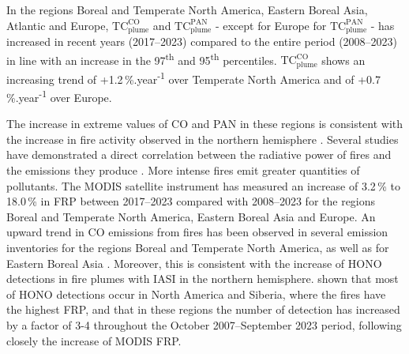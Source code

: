 \documentclass[acp, manuscript]{copernicus}
\begin{document}
In the regions Boreal and Temperate North America, Eastern Boreal Asia, Atlantic and Europe, $\text{TC}_{\text{plume}}^{\text{CO}}$ and $\text{TC}_{\text{plume}}^{\text{PAN}}$ - except for Europe for $\text{TC}_{\text{plume}}^{\text{PAN}}$ - has increased in recent years (2017--2023) compared to the entire period (2008--2023) in line with an increase in the 97\textsuperscript{th} and 95\textsuperscript{th} percentiles. $\text{TC}_{\text{plume}}^{\text{CO}}$ shows an increasing trend of +1.2\,\%.year\textsuperscript{-1} over Temperate North America and of +0.7\,\%.year\textsuperscript{-1} over Europe. 

The increase in extreme values of CO and PAN in these regions is consistent with the increase in fire activity observed in the northern hemisphere \citep{ehretIncreaseCarbonMonoxide2025}.
Several studies have demonstrated a direct correlation between the radiative power of fires and the emissions they produce \citep{woosterRetrievalBiomassCombustion2005,kaiserBiomassBurningEmissions2012,wigginsHighTemporalResolution2020}. More intense fires emit greater quantities of pollutants. The MODIS satellite instrument has measured an increase of 3.2\,\% to 18.0\,\% in FRP between 2017--2023 compared with 2008--2023 for the regions Boreal and Temperate North America, Eastern Boreal Asia and Europe. An upward trend in CO emissions from fires has been observed in several emission inventories for the regions Boreal and Temperate North America, as well as for Eastern Boreal Asia \citep{griffinBiomassBurningCO2024}. Moreover, this is consistent with the increase of HONO detections in fire plumes with IASI in the northern hemisphere. \citet{francoPyrogenicHONOSeen2024} shown that most of HONO detections occur in North America and Siberia, where the fires have the highest FRP, and that in these regions the number of detection has increased by a factor of 3-4 throughout the October 2007--September 2023 period, following closely the increase of MODIS FRP.


\end{document}
